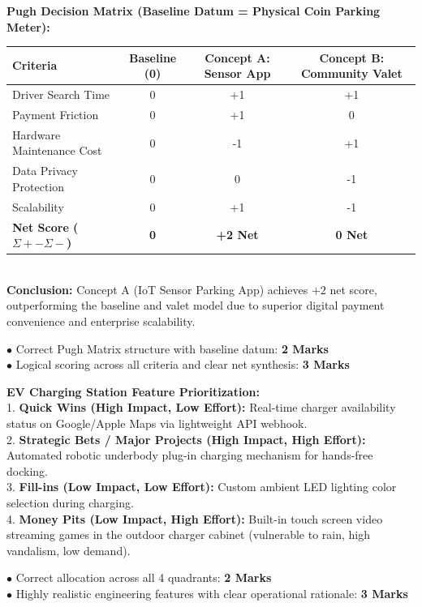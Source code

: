 \begin{solutionbox}
\textbf{Pugh Decision Matrix (Baseline Datum = Physical Coin Parking Meter):}\\
\begin{tabularx}{\linewidth}{|X|c|c|c|} \hline
\textbf{Criteria} & \textbf{Baseline (0)} & \textbf{Concept A: Sensor App} & \textbf{Concept B: Community Valet} \\ \hline
Driver Search Time & 0 & +1 & +1 \\ \hline
Payment Friction & 0 & +1 & 0 \\ \hline
Hardware Maintenance Cost & 0 & -1 & +1 \\ \hline
Data Privacy Protection & 0 & 0 & -1 \\ \hline
Scalability & 0 & +1 & -1 \\ \hline
\textbf{Net Score ($\Sigma + - \Sigma -$)} & \textbf{0} & \textbf{+2 Net} & \textbf{0 Net} \\ \hline
\end{tabularx}\\
\textbf{Conclusion:} Concept A (IoT Sensor Parking App) achieves $+2$ net score, outperforming the baseline and valet model due to superior digital payment convenience and enterprise scalability.
\begin{markingrubric}
$\bullet$ Correct Pugh Matrix structure with baseline datum: \textbf{2 Marks}\\
$\bullet$ Logical scoring across all criteria and clear net synthesis: \textbf{3 Marks}
\end{markingrubric}
\end{solutionbox}

\begin{solutionbox}
\textbf{EV Charging Station Feature Prioritization:}\\
1. \textbf{Quick Wins (High Impact, Low Effort):} Real-time charger availability status on Google/Apple Maps via lightweight API webhook.\\
2. \textbf{Strategic Bets / Major Projects (High Impact, High Effort):} Automated robotic underbody plug-in charging mechanism for hands-free docking.\\
3. \textbf{Fill-ins (Low Impact, Low Effort):} Custom ambient LED lighting color selection during charging.\\
4. \textbf{Money Pits (Low Impact, High Effort):} Built-in touch screen video streaming games in the outdoor charger cabinet (vulnerable to rain, high vandalism, low demand).
\begin{markingrubric}
$\bullet$ Correct allocation across all 4 quadrants: \textbf{2 Marks}\\
$\bullet$ Highly realistic engineering features with clear operational rationale: \textbf{3 Marks}
\end{markingrubric}
\end{solutionbox}

